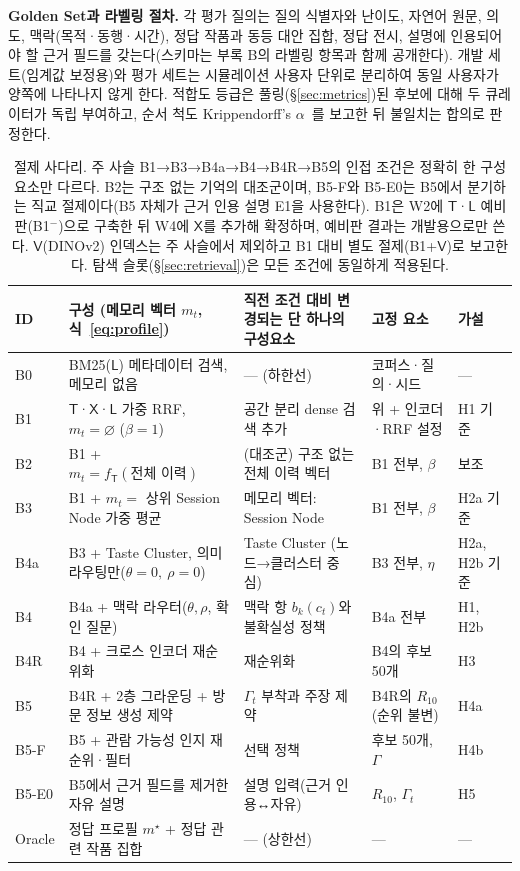 \documentclass[10pt,twocolumn,letterpaper]{article}
\newcommand{\sT}{\mathsf{T}}
\newcommand{\sX}{\mathsf{X}}
\newcommand{\sV}{\mathsf{V}}
\newcommand{\sL}{\mathsf{L}}
\begin{document}
\textbf{Golden Set과 라벨링 절차.} 각 평가 질의는 질의 식별자와 난이도, 자연어 원문, 의도, 맥락(목적·동행·시간), 정답 작품과 동등 대안 집합, 정답 전시, 설명에 인용되어야 할 근거 필드를 갖는다(스키마는 부록 B의 라벨링 항목과 함께 공개한다). 개발 세트(임계값 보정용)와 평가 세트는 시뮬레이션 사용자 단위로 분리하여 동일 사용자가 양쪽에 나타나지 않게 한다. 적합도 등급은 풀링(§\ref{sec:metrics})된 후보에 대해 두 큐레이터가 독립 부여하고, 순서 척도 Krippendorff's $\alpha$~\cite{hayes2007alpha}를 보고한 뒤 불일치는 합의로 판정한다.

\begin{table}[t]
\centering\small
\setlength{\tabcolsep}{4pt}
\renewcommand{\arraystretch}{1.12}
\begin{tabularx}{\textwidth}{@{}l>{\raggedright\arraybackslash}p{5.3cm}>{\raggedright\arraybackslash}X>{\raggedright\arraybackslash}p{3.3cm}l@{}}
\toprule
ID & 구성 (메모리 벡터 $m_t$, 식~\eqref{eq:profile}) & 직전 조건 대비 변경되는 단 하나의 구성요소 & 고정 요소 & 가설 \\
\midrule
B0 & BM25($\sL$) 메타데이터 검색, 메모리 없음 & — (하한선) & 코퍼스·질의·시드 & — \\
B1 & $\sT$·$\sX$·$\sL$ 가중 RRF, $m_t=\varnothing$ ($\beta{=}1$) & 공간 분리 dense 검색 추가 & 위 + 인코더·RRF 설정 & H1 기준 \\
\rowcolor{rowg} B2 & B1 + $m_t=f_\sT(\text{전체 이력})$ & (대조군) 구조 없는 전체 이력 벡터 & B1 전부, $\beta$ & 보조 \\
B3 & B1 + $m_t=$ 상위 Session Node 가중 평균 & 메모리 벡터: Session Node & B1 전부, $\beta$ & H2a 기준 \\
B4a & B3 + Taste Cluster, 의미 라우팅만($\theta{=}0,\ \rho{=}0$) & Taste Cluster (노드→클러스터 중심) & B3 전부, $\eta$ & H2a, H2b 기준 \\
B4 & B4a + 맥락 라우터($\theta,\rho$, 확인 질문) & 맥락 항 $b_k(c_t)$와 불확실성 정책 & B4a 전부 & H1, H2b \\
B4R & B4 + 크로스 인코더 재순위화 & 재순위화 & B4의 후보 50개 & H3 \\
B5 & B4R + 2층 그라운딩 + 방문 정보 생성 제약 & $\Gamma_t$ 부착과 주장 제약 & B4R의 $R_{10}$ (순위 불변) & H4a \\
B5-F & B5 + 관람 가능성 인지 재순위·필터 & 선택 정책 & 후보 50개, $\Gamma$ & H4b \\
B5-E0 & B5에서 근거 필드를 제거한 자유 설명 & 설명 입력(근거 인용↔자유) & $R_{10}$, $\Gamma_t$ & H5 \\
\rowcolor{rowg} Oracle & 정답 프로필 $m^\star$ + 정답 관련 작품 집합 & — (상한선) & — & — \\
\bottomrule
\end{tabularx}
\caption{절제 사다리. 주 사슬 B1→B3→B4a→B4→B4R→B5의 인접 조건은 정확히 한 구성요소만 다르다. B2는 구조 없는 기억의 대조군이며, B5-F와 B5-E0는 B5에서 분기하는 직교 절제이다(B5 자체가 근거 인용 설명 E1을 사용한다). B1은 W2에 $\sT$·$\sL$ 예비판(B1$^-$)으로 구축한 뒤 W4에 $\sX$를 추가해 확정하며, 예비판 결과는 개발용으로만 쓴다. $\sV$(DINOv2) 인덱스는 주 사슬에서 제외하고 B1 대비 별도 절제(B1+$\sV$)로 보고한다. 탐색 슬롯(§\ref{sec:retrieval})은 모든 조건에 동일하게 적용된다.}
\label{tab:ladder}
\end{table}
\end{document}
